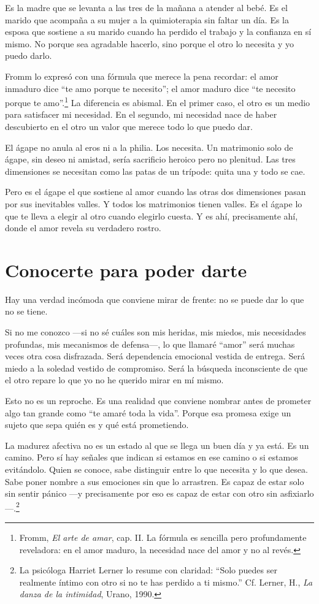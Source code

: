 Es la madre que se levanta a las tres de la mañana a atender al bebé. Es el marido que acompaña a su mujer a la quimioterapia sin faltar un día. Es la esposa que sostiene a su marido cuando ha perdido el trabajo y la confianza en sí mismo. No porque sea agradable hacerlo, sino porque el otro lo necesita y yo puedo darlo.

Fromm lo expresó con una fórmula que merece la pena recordar: el amor inmaduro dice ``te amo porque te necesito''; el amor maduro dice ``te necesito porque te amo''.\footnote{Fromm, \textit{El arte de amar}, cap. II. La fórmula es sencilla pero profundamente reveladora: en el amor maduro, la necesidad nace del amor y no al revés.} La diferencia es abismal. En el primer caso, el otro es un medio para satisfacer mi necesidad. En el segundo, mi necesidad nace de haber descubierto en el otro un valor que merece todo lo que puedo dar.

El ágape no anula al eros ni a la philia. Los necesita. Un matrimonio solo de ágape, sin deseo ni amistad, sería sacrificio heroico pero no plenitud. Las tres dimensiones se necesitan como las patas de un trípode: quita una y todo se cae.

Pero es el ágape el que sostiene al amor cuando las otras dos dimensiones pasan por sus inevitables valles. Y todos los matrimonios tienen valles. Es el ágape lo que te lleva a elegir al otro cuando elegirlo cuesta. Y es ahí, precisamente ahí, donde el amor revela su verdadero rostro.

\section{Conocerte para poder darte}

Hay una verdad incómoda que conviene mirar de frente: no se puede dar lo que no se tiene.

Si no me conozco ---si no sé cuáles son mis heridas, mis miedos, mis necesidades profundas, mis mecanismos de defensa---, lo que llamaré ``amor'' será muchas veces otra cosa disfrazada. Será dependencia emocional vestida de entrega. Será miedo a la soledad vestido de compromiso. Será la búsqueda inconsciente de que el otro repare lo que yo no he querido mirar en mí mismo.

Esto no es un reproche. Es una realidad que conviene nombrar antes de prometer algo tan grande como ``te amaré toda la vida''. Porque esa promesa exige un sujeto que sepa quién es y qué está prometiendo.

La madurez afectiva no es un estado al que se llega un buen día y ya está. Es un camino. Pero sí hay señales que indican si estamos en ese camino o si estamos evitándolo. Quien se conoce, sabe distinguir entre lo que necesita y lo que desea. Sabe poner nombre a sus emociones sin que lo arrastren. Es capaz de estar solo sin sentir pánico ---y precisamente por eso es capaz de estar con otro sin asfixiarlo---.\footnote{La psicóloga Harriet Lerner lo resume con claridad: ``Solo puedes ser realmente íntimo con otro si no te has perdido a ti mismo.'' Cf. Lerner, H., \textit{La danza de la intimidad}, Urano, 1990.}

